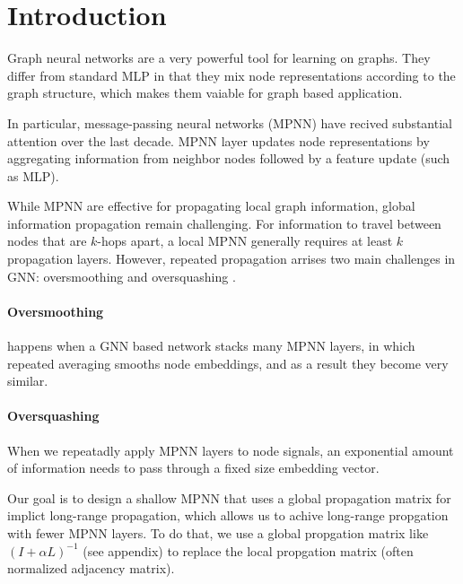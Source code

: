 \section{Introduction}
Graph neural networks \cite{hamiltonGraphRepresentationLearning} are a very
powerful tool for learning on graphs. They differ from standard MLP in that
they mix node representations according to the graph structure, which makes
them vaiable for graph based application.

In particular, message-passing neural networks (MPNN)
\cite{gilmerNeuralMessagePassing2017} have recived substantial attention over the
last decade. MPNN layer updates node representations by aggregating
information from neighbor nodes followed by a feature update (such as MLP).

While MPNN are effective for propagating local graph information, global
information propagation remain challenging. For information to travel between
nodes that are $k$-hops apart, a local MPNN generally requires at least $k$ propagation layers.
However, repeated propagation arrises two main challenges in GNN:
oversmoothing and oversquashing
\cite{arnaiz-rodriguezOversmoothingOversquashingHeterophily2026} .

\paragraph{Oversmoothing
    \cite{arnaiz-rodriguezOversmoothingOversquashingHeterophily2026}} happens when
a GNN based network stacks many MPNN layers, in which repeated averaging
smooths node embeddings, and as a result they become very similar.

\paragraph{Oversquashing
    \cite{arnaiz-rodriguezOversmoothingOversquashingHeterophily2026}} When we
repeatadly apply MPNN layers to node signals, an exponential amount of
information needs to pass through a fixed size embedding vector.

Our goal is to design a shallow MPNN that uses a global propagation matrix for
implict long-range propagation, which allows us to achive long-range propgation
with fewer MPNN layers. To do that, we use a global propgation matrix like $(I
    + \alpha L)^{-1}$ (see appendix) to replace the local propgation matrix (often
normalized adjacency matrix).


